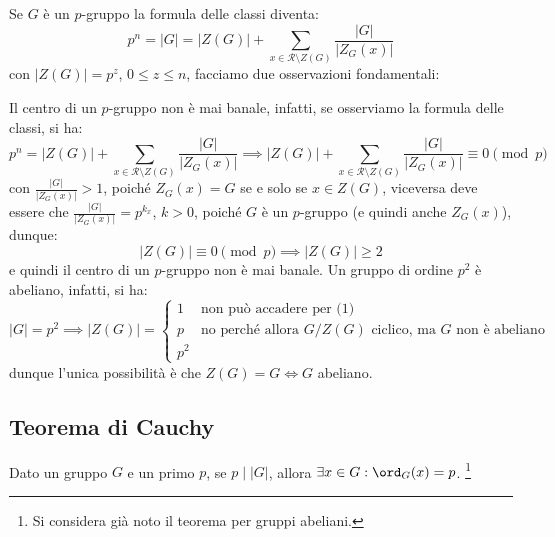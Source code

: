 \documentclass[11pt]{scrartcl}
\begin{document}
Se $G$ è un $p$-gruppo la formula delle classi diventa:
    \[ p^n = |G| = |Z(G)| + \sum_{x \in \mathcal{R}\setminus Z(G)} \frac{|G|}{|Z_G(x)|}
        \]
con $|Z(G)| = p^z$, $0 \leq z \leq n$, facciamo due osservazioni fondamentali:
    \begin{enumerate}[(1)]
        \ii Il centro di un $p$-gruppo non è mai banale, infatti, se osserviamo la formula delle classi, si ha:
            \[ p^n = |Z(G)| +  \sum_{x \in \mathcal{R}\setminus Z(G)} \frac{|G|}{|Z_G(x)|} \implies
             |Z(G)| +  \sum_{x \in \mathcal{R}\setminus Z(G)}\frac{|G|}{|Z_G(x)|} \equiv 0 \pmod p
                \]
            con $\displaystyle \frac{|G|}{|Z_G(x)|} > 1$, poiché $Z_G(x) = G$ se e solo se $x \in Z(G)$,
            viceversa deve essere che $\displaystyle \frac{|G|}{|Z_G(x)|} = p^{k_x}$, $k>0$, poiché $G$ è un $p$-gruppo (e quindi anche $Z_G(x)$), dunque:
                \[ |Z(G)| \equiv 0 \pmod p \implies |Z(G)| \geq 2
                    \]
            e quindi il centro di un $p$-gruppo non è mai banale.
        \ii Un gruppo di ordine $p^2$ è abeliano, infatti, si ha:
            \[ |G| = p^2 \implies |Z(G)| = \begin{cases}
                                                1 &\text{non può accadere per (1)} \\
                                                p &\text{no perché allora $G/Z(G)$ ciclico, ma $G$ non è abeliano}\\
                                                p^2
                                            \end{cases}
                \]
            dunque l'unica possibilità è che $Z(G) = G \iff G$ abeliano.
    \end{enumerate}

\newpage
\subsection{Teorema di Cauchy}

\begin{theorem}
    \label{p:Cauchy}
    Dato un gruppo $G$ e un primo $p$, se $p \mid |G|$, allora $\exists x \in G : \ord_G(x) = p$. \footnote{Si considera già noto il teorema per gruppi abeliani.}
\end{theorem}
\end{document}
